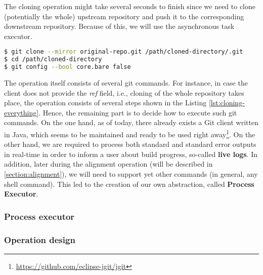 \documentclass[../main.tex]{subfiles}
\begin{document}
The cloning operation might take several seconds to finish since we need to clone (potentially the whole) upstream repository and push it to the corresponding downstream repository. Because of this, we will use the asynchronous task executor.

\begin{lstlisting}[numbers=none, language=bash, label={lst:cloning-everything}, caption=Cloning the whole repository]
$ git clone --mirror original-repo.git /path/cloned-directory/.git
$ cd /path/cloned-directory
$ git config --bool core.bare false
\end{lstlisting}

The operation itself consists of several git commands. For instance, in case the client does not provide the \textit{ref} field, i.e., cloning of the whole repository takes place, the operation consists of several steps\cite{gitfaq} shown in the Listing \ref{lst:cloning-everything}. Hence, the remaining part is to decide how to execute such git commands. On the one hand, as of today, there already exists a Git client written in Java, which seems to be maintained and ready to be used right away\footnote{\url{https://github.com/eclipse-jgit/jgit}}. On the other hand, we are required to process both standard and standard error outputs in real-time in order to inform a user about build progress, so-called \textbf{live logs}. In addition, later during the alignment operation (will be described in \ref{section:alignment}), we will need to support yet other commands (in general, any shell command). This led to the creation of our own abstraction, called \textbf{Process Executor}.

\subsubsection*{Process executor}
\label{subsubsec:process-executor}


\subsubsection*{Operation design}

\end{document}
